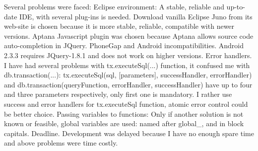 Several problems were faced:
Eclipse environment: A stable, reliable and up-to-date IDE, with several plug-ins is needed. Download vanilla Eclipse Juno from its web-site is chosen because it is more stable, reliable, compatible with newer versions.  Aptana Javascript plugin was chosen because Aptana allows source code auto-completion in JQuery.
PhoneGap and Android incompatibilities. Android 2.3.3 requires JQuery-1.8.1 and does not work on higher versions. 
Error handlers. I have had several problems with tx.executeSql(...) function, it confused me with db.transaction(...): 
tx.executeSql(sql, [parameters],  successHandler, errorHandler)
and
db.transaction(queryFunction, errorHandler, successHandler)  
have up to four and three parameters respectively, only first one is mandatory. I rather use success and error handlers for tx.executeSql function, atomic error control could be better choice.
Passing variables to functions: Only if another solution is not known or feasible, global variables are used: named after global\_\*, and in block capitals.
Deadline. Development was delayed because I have no enough spare time and above problems were time costly.

